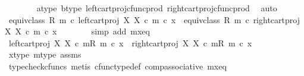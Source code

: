 \begin{isabellebody}
\ \ \ \ \ \ \isamarkupfalse%
\ a{\isacharunderscore}{\kern0pt}type\ b{\isacharunderscore}{\kern0pt}type\ left{\isacharunderscore}{\kern0pt}cart{\isacharunderscore}{\kern0pt}proj{\isacharunderscore}{\kern0pt}cfunc{\isacharunderscore}{\kern0pt}prod\ right{\isacharunderscore}{\kern0pt}cart{\isacharunderscore}{\kern0pt}proj{\isacharunderscore}{\kern0pt}cfunc{\isacharunderscore}{\kern0pt}prod\ \isamarkupfalse%
\ auto\isanewline
\ \ \ \ \isamarkupfalse%
\ \isamarkupfalse%
\ {\isachardoublequoteopen}equiv{\isacharunderscore}{\kern0pt}class\ {\isacharparenleft}{\kern0pt}R{\isacharcomma}{\kern0pt}\ m{\isacharparenright}{\kern0pt}\ {\isasymcirc}\isactrlsub c\ left{\isacharunderscore}{\kern0pt}cart{\isacharunderscore}{\kern0pt}proj\ X\ X\ {\isasymcirc}\isactrlsub c\ m\ {\isasymcirc}\isactrlsub c\ x\ {\isacharequal}{\kern0pt}\ equiv{\isacharunderscore}{\kern0pt}class\ {\isacharparenleft}{\kern0pt}R{\isacharcomma}{\kern0pt}\ m{\isacharparenright}{\kern0pt}\ {\isasymcirc}\isactrlsub c\ right{\isacharunderscore}{\kern0pt}cart{\isacharunderscore}{\kern0pt}proj\ X\ X\ {\isasymcirc}\isactrlsub c\ m\ {\isasymcirc}\isactrlsub c\ x{\isachardoublequoteclose}\isanewline
\ \ \ \ \ \ \isamarkupfalse%
\ {\isacharparenleft}{\kern0pt}simp\ add{\isacharcolon}{\kern0pt}\ m{\isacharunderscore}{\kern0pt}x{\isacharunderscore}{\kern0pt}eq{\isacharparenright}{\kern0pt}\isanewline
\ \ \ \ \isamarkupfalse%
\ \isamarkupfalse%
\ {\isachardoublequoteopen}{\isacharbrackleft}{\kern0pt}left{\isacharunderscore}{\kern0pt}cart{\isacharunderscore}{\kern0pt}proj\ X\ X\ {\isasymcirc}\isactrlsub c\ m{\isacharbrackright}{\kern0pt}\isactrlbsub {\isacharparenleft}{\kern0pt}R{\isacharcomma}{\kern0pt}\ m{\isacharparenright}{\kern0pt}\isactrlesub \ {\isasymcirc}\isactrlsub c\ x\ {\isacharequal}{\kern0pt}\ {\isacharbrackleft}{\kern0pt}right{\isacharunderscore}{\kern0pt}cart{\isacharunderscore}{\kern0pt}proj\ X\ X\ {\isasymcirc}\isactrlsub c\ m{\isacharbrackright}{\kern0pt}\isactrlbsub {\isacharparenleft}{\kern0pt}R{\isacharcomma}{\kern0pt}\ m{\isacharparenright}{\kern0pt}\isactrlesub \ {\isasymcirc}\isactrlsub c\ x{\isachardoublequoteclose}\isanewline
\ \ \ \ \ \ \isamarkupfalse%
\ x{\isacharunderscore}{\kern0pt}type\ m{\isacharunderscore}{\kern0pt}type\ assms\ \isamarkupfalse%
\ {\isacharparenleft}{\kern0pt}typecheck{\isacharunderscore}{\kern0pt}cfuncs{\isacharcomma}{\kern0pt}\ metis\ cfunc{\isacharunderscore}{\kern0pt}type{\isacharunderscore}{\kern0pt}def\ comp{\isacharunderscore}{\kern0pt}associative\ m{\isacharunderscore}{\kern0pt}x{\isacharunderscore}{\kern0pt}eq{\isacharparenright}{\kern0pt}\isanewline

\end{isabellebody}
